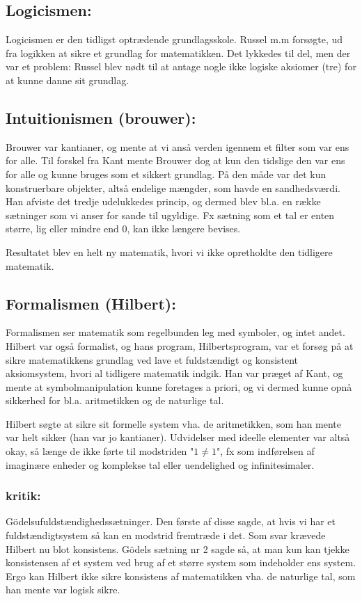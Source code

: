 \documentclass[a4paper,oneside,12pt]{memoir}
\begin{document}
\subsection{Logicismen:}
Logicismen er den tidligst optrædende grundlagsskole. Russel m.m forsøgte, ud fra logikken at sikre et grundlag for matematikken. Det lykkedes til del, men der var et problem: Russel blev nødt til at antage nogle ikke logiske aksiomer (tre) for at kunne danne sit grundlag.

\subsection{Intuitionismen (brouwer):}
Brouwer var kantianer, og mente at vi anså verden igennem et filter som var ens for alle. Til forskel fra Kant mente Brouwer dog at kun den tidslige den var ens for alle og kunne bruges som et sikkert grundlag. På den måde var det kun konstruerbare objekter, altså endelige mængder, som havde en sandhedsværdi. Han afviste det tredje udelukkedes princip, og dermed blev bl.a. en række sætninger som vi anser for sande til ugyldige. Fx sætning som et tal er enten større, lig eller mindre end 0, kan ikke længere bevises. 

Resultatet blev en helt ny matematik, hvori vi ikke opretholdte den tidligere matematik.

\subsection{Formalismen (Hilbert):}
Formalismen ser matematik som regelbunden leg med symboler, og intet andet. Hilbert var også formalist, og hans program, Hilbertsprogram, var et forsøg på at sikre matematikkens grundlag ved lave et fuldstændigt og konsistent aksiomsystem, hvori al tidligere matematik indgik. Han var præget af Kant, og mente at symbolmanipulation kunne foretages a priori, og vi dermed kunne opnå sikkerhed for bl.a. aritmetikken og de naturlige tal.

Hilbert søgte at sikre sit formelle system vha. de aritmetikken, som han mente var helt sikker (han var jo kantianer). Udvidelser med ideelle elementer var altså okay, så længe de ikke førte til modstriden "$1 \neq 1$", fx som indførelsen af imaginære enheder og komplekse tal eller uendelighed og infinitesimaler.

\subsubsection{kritik:} Gödelsufuldstændighedssætninger. Den første af disse sagde, at hvis vi har et fuldstændigtsystem så kan en modstrid fremtræde i det. Som svar krævede Hilbert nu blot konsistens. Gödels sætning nr 2 sagde så, at man kun kan tjekke konsistensen af et system ved brug af et større system som indeholder ens system. Ergo kan Hilbert ikke sikre konsistens af matematikken vha. de naturlige tal, som han mente var logisk sikre.
\end{document}
